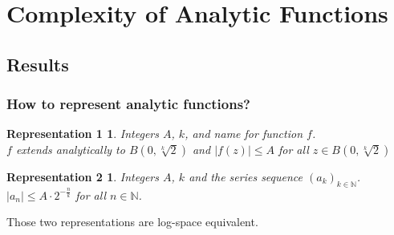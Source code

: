 \documentclass[xcolor=pdftex,dvipsnames,table,handout]{beamer}
\newcommand{\N}{\ensuremath{\mathbb{N}}}
\newcommand{\abs}[1]{\left|#1\right|}
\newtheorem{representation1}{Representation 1}
\newtheorem{representation2}{Representation 2}
\begin{document}
\section{Complexity of Analytic Functions}
\subsection{Results}
\frametitle{How to represent analytic functions?}
\begin{frame}
\begin{representation1}
  Integers $A$, $k$, and name for function $f$.\\
  $f$ extends analytically to $B(0, \sqrt[k]{2})$ and $\abs{f(z)} \leq A$ for all $z \in B(0, \sqrt[k]{2})$
\end{representation1}
\begin{representation2}
  Integers $A$, $k$ and the series sequence $(a_k)_{k \in \N}$.\\
  $\abs{a_n} \leq A \cdot 2^{-\frac{n}{k}}$ for all $n \in \N$.
\end{representation2}
Those two representations are log-space equivalent.
\end{frame}
\begin{frame}
  
\end{frame}
\end{document}
